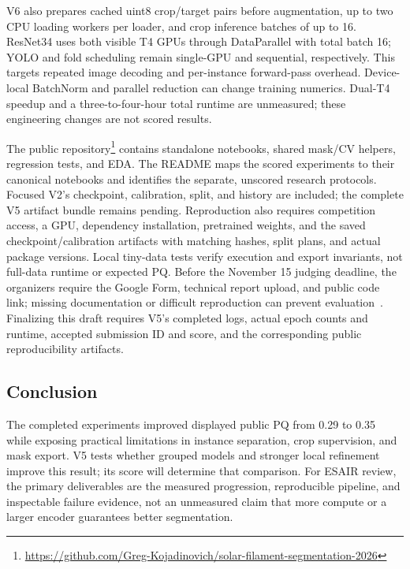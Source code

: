 \documentclass[sigconf]{acmart}
\begin{document}
V6 also prepares cached uint8 crop/target pairs before augmentation,
up to two CPU loading workers per loader, and crop inference batches of
up to 16. ResNet34 uses both visible T4 GPUs through DataParallel with
total batch 16; YOLO and fold scheduling remain single-GPU and sequential,
respectively. This targets repeated image decoding and per-instance
forward-pass overhead. Device-local BatchNorm and parallel reduction can
change training numerics. Dual-T4 speedup and a three-to-four-hour total
runtime are unmeasured; these engineering changes are not scored results.

The public repository\footnote{\url{https://github.com/Greg-Kojadinovich/solar-filament-segmentation-2026}}
contains standalone notebooks, shared mask/CV helpers, regression tests,
and EDA. The README maps the scored experiments to their canonical notebooks
and identifies the separate, unscored research protocols.
Focused V2's checkpoint, calibration, split, and history are included;
the complete V5 artifact bundle remains pending. Reproduction also requires competition access, a GPU, dependency
installation, pretrained weights, and the saved checkpoint/calibration
artifacts with matching hashes, split plans, and actual package versions.
Local tiny-data tests verify execution and export invariants, not
full-data runtime or expected PQ. Before the November 15 judging deadline,
the organizers require the Google Form, technical report upload, and public
code link; missing documentation or difficult reproduction can prevent
evaluation~\cite{filamentannouncements}. Finalizing this draft requires
V5's completed logs, actual epoch counts and runtime, accepted submission
ID and score, and the corresponding public reproducibility artifacts.

\subsection{Conclusion}
The completed experiments improved displayed public PQ from 0.29 to 0.35
while exposing practical limitations in instance separation, crop supervision,
and mask export. V5 tests whether grouped models and stronger local refinement
improve this result; its score will determine that comparison.
For ESAIR review, the primary deliverables are the measured progression,
reproducible pipeline, and inspectable failure evidence, not an unmeasured
claim that more compute or a larger encoder guarantees better segmentation.

\end{document}
